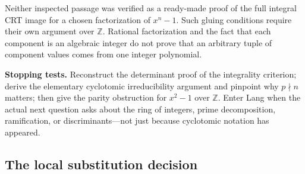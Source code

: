 \documentclass[
  11pt,
]{article}
\begin{document}
Neither inspected passage was verified as a ready-made proof of the full
integral CRT image for a chosen factorization of \(x^n-1\). Such gluing
conditions require their own argument over \(\mathbb Z\). Rational
factorization and the fact that each component is an algebraic integer
do not prove that an arbitrary tuple of component values comes from one
integer polynomial.

\textbf{Stopping tests.} Reconstruct the determinant proof of the
integrality criterion; derive the elementary cyclotomic irreducibility
argument and pinpoint why \(p\nmid n\) matters; then give the parity
obstruction for \(x^2-1\) over \(\mathbb Z\). Enter Lang when the actual
next question asks about the ring of integers, prime decomposition,
ramification, or discriminants---not just because cyclotomic notation
has appeared.

\subsection{The local substitution
decision}\label{the-local-substitution-decision}
\end{document}
